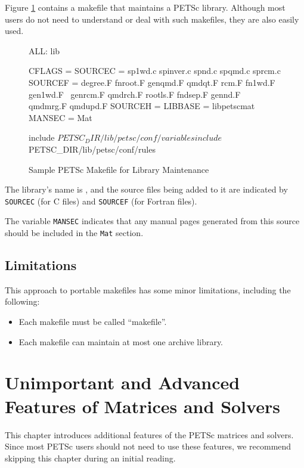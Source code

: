 {{Figure \ref{fig_make3} contains a makefile that maintains a PETSc
library.  Although most users do not need to understand or deal with such
makefiles, they are also easily used.
\begin{figure}[H]
\begin{makelisting}
ALL: lib

CFLAGS   =
SOURCEC  = sp1wd.c spinver.c spnd.c spqmd.c sprcm.c
SOURCEF  = degree.F  fnroot.F genqmd.F qmdqt.F rcm.F fn1wd.F gen1wd.F \ 
          genrcm.F qmdrch.F rootls.F fndsep.F gennd.F qmdmrg.F qmdupd.F
SOURCEH  = 
LIBBASE  = libpetscmat
MANSEC   = Mat

include ${PETSC_DIR}/lib/petsc/conf/variables
include ${PETSC_DIR}/lib/petsc/conf/rules
\end{makelisting}
\caption{Sample PETSc Makefile for Library Maintenance}
\label{fig_make3}
\end{figure}

The library's name is , and the source files being added
to it are indicated by \lstinline{SOURCEC} (for C files) and \lstinline{SOURCEF} (for
Fortran files).

The variable \lstinline{MANSEC} indicates that any manual pages generated
from this source should be included in the \lstinline{Mat} section.

\section{Limitations}

This approach to portable makefiles has some minor limitations, including
the following:
\begin{itemize}
\item Each makefile must be called ``makefile''.
\item Each makefile can maintain at most one archive library.
\end{itemize}


\cleardoublepage
\chapter{Unimportant and Advanced Features of Matrices and Solvers}
\label{ch_advanced}

This chapter introduces additional features of the PETSc matrices and solvers.
Since most PETSc users should not need to use these features,
we recommend skipping this chapter during an initial reading.

}}
